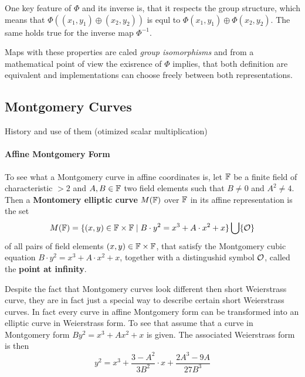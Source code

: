 One key feature of $\Phi$ and its inverse is, that it respects the group structure, which means that $\Phi((x_1,y_1)\oplus (x_2,y_2))$ is equl to $\Phi(x_1,y_1)\oplus \Phi(x_2,y_2)$. The same holds true for the inverse map $\Phi^{-1}$.

Maps with these properties are caled \textit{group isomorphisms} and from a mathematical point of view the exisrence of $\Phi$ implies, that both definition are equivalent and implementations can choose freely between both representations.


\subsection{Montgomery Curves}
History and use of them (otimized scalar multiplication)

\paragraph{Affine Montgomery Form}
To see what a Montgomery curve in affine coordinates is, let $\mathbb{F}$ be a finite field of characteristic $>2$ and $A,B\in \mathbb{F}$ two field elements such that $B\neq 0$ and $A^2 \neq 4$. Then a \textbf{Montomery elliptic curve} $M(\mathbb{F})$ over $\mathbb{F}$ in its affine representation is the set
\begin{equation}
\label{def_short_weierstrass_curve}
M(\mathbb{F}) = \{(x,y)\in \mathbb{F}\times \mathbb{F}\;|\; B\cdot y^2 = x^3 + A\cdot x^2 + x  \} \bigcup \{\mathcal{O}\}
\end{equation}
of all pairs of field elements $(x,y)\in \mathbb{F}\times \mathbb{F}$, that satisfy the Montgomery cubic equation $B\cdot y^2 = x^3 + A\cdot x^2 + x$, together with a distingushid symbol $\mathcal{O}$, called the \textbf{point at infinity}.

Despite the fact that Montgomery curves look different then short Weierstrass curve, they are in fact just a special way to describe certain short Weierstrass curves. In fact every curve in affine Montgomery form can be transformed into an elliptic curve in Weierstrass form. To see that assume that a curve in Montgomery form $B y^2 = x^3 + A x^2 + x$ is given. The associated Weierstrass form is then
$$
y^2 = x^3 + \frac{3-A^2}{3B^2}\cdot x + \frac{2A^3-9A}{27B^3}
$$

